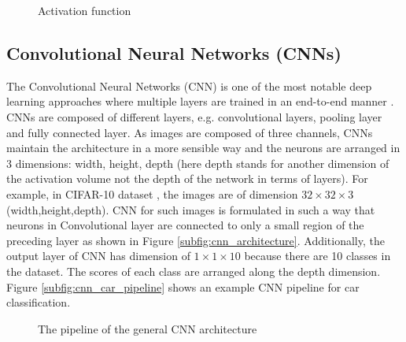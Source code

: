 \begin{figure}[h!]
  \centering  
  \hspace{4em} %
  \caption{Activation function \cite{cnnlecture2017}}
  \label{fig:activation_function}
\end{figure}


\subsection{Convolutional Neural Networks (CNNs)}
The Convolutional Neural Networks (CNN) is one of the most notable deep learning approaches where multiple layers are trained in an end-to-end manner \cite{lecun1998}. CNNs are composed of different layers, e.g. convolutional layers, pooling layer and fully connected layer. As images are composed of three channels, CNNs maintain the architecture in a more sensible way and the neurons are arranged in 3 dimensions: width, height, depth (here depth stands for another dimension of the activation volume not the depth of the network in terms of layers). For example, in CIFAR-10 dataset \cite{Krizhevsky09learningmultiple}, the images are of dimension $32 \times 32 \times 3$ (width,height,depth). CNN for such images is formulated in such a way that neurons in Convolutional layer are connected to only a small region of the preceding layer as shown in Figure \ref{subfig:cnn_architecture}. Additionally, the output layer of CNN has dimension of $1 \times 1 \times 10$ because there are 10 classes in the dataset. The scores of each class are arranged along the depth dimension. Figure \ref{subfig:cnn_car_pipeline} shows an example CNN pipeline for car classification.

\begin{figure}[h!]
  \centering  
  \caption{The pipeline of the general CNN architecture}
\end{figure}

